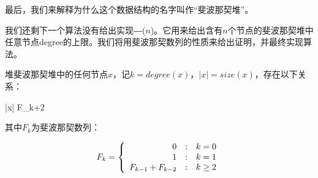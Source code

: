 \documentclass{ctexart}
\begin{document}
最后，我们来解释为什么这个数据结构的名字叫作“斐波那契堆”。

我们还剩下一个算法没有给出实现―($n$)。它用来给出含有$n$个节点的斐波那契堆中任意节点degree的上限。我们将用斐波那契数列的性质来给出证明，并最终实现算法。

\begin{lemma}
\label{lemma:Fib-degree}
堆斐波那契堆中的任何节点$x$，记$k = degree(x)$，$|x| = size(x)$，存在以下关系：

\be
  |x| \geq F_{k+2}
\ee

其中$F_k$为斐波那契数列：

\[
F_k = \left \{
  \begin{array}
  {r@{\quad:\quad}l}
  0 & k = 0 \\
  1 & k = 1 \\
  F_{k-1} + F_{k-2} & k \geq 2
  \end{array}
\right.
\]
\end{lemma}
\end{document}
